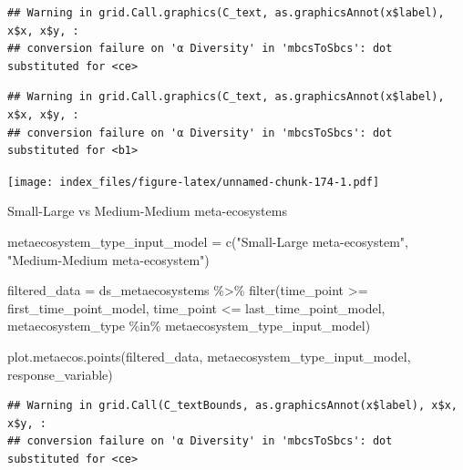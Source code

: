 \documentclass[
]{article}
\newenvironment{Shaded}{\begin{snugshade}}{\end{snugshade}}
\newcommand{\FunctionTok}[1]{\textcolor[rgb]{0.00,0.00,0.00}{#1}}
\newcommand{\NormalTok}[1]{#1}
\newcommand{\OtherTok}[1]{\textcolor[rgb]{0.56,0.35,0.01}{#1}}
\newcommand{\SpecialCharTok}[1]{\textcolor[rgb]{0.00,0.00,0.00}{#1}}
\newcommand{\StringTok}[1]{\textcolor[rgb]{0.31,0.60,0.02}{#1}}
\begin{document}
\begin{verbatim}
## Warning in grid.Call.graphics(C_text, as.graphicsAnnot(x$label), x$x, x$y, :
## conversion failure on 'α Diversity' in 'mbcsToSbcs': dot substituted for <ce>
\end{verbatim}

\begin{verbatim}
## Warning in grid.Call.graphics(C_text, as.graphicsAnnot(x$label), x$x, x$y, :
## conversion failure on 'α Diversity' in 'mbcsToSbcs': dot substituted for <b1>
\end{verbatim}

\texttt{[image: index\_files/figure-latex/unnamed-chunk-174-1.pdf]}

Small-Large vs Medium-Medium meta-ecosystems

\begin{Shaded}
\begin{Highlighting}[]
\NormalTok{metaecosystem\_type\_input\_model }\OtherTok{=} \FunctionTok{c}\NormalTok{(}\StringTok{"Small{-}Large meta{-}ecosystem"}\NormalTok{,}
                                   \StringTok{"Medium{-}Medium meta{-}ecosystem"}\NormalTok{)}
\end{Highlighting}
\end{Shaded}

\begin{Shaded}
\begin{Highlighting}[]
\NormalTok{filtered\_data }\OtherTok{=}\NormalTok{ ds\_metaecosystems }\SpecialCharTok{\%\textgreater{}\%}
                         \FunctionTok{filter}\NormalTok{(time\_point }\SpecialCharTok{\textgreater{}=}\NormalTok{ first\_time\_point\_model,}
\NormalTok{                                time\_point }\SpecialCharTok{\textless{}=}\NormalTok{ last\_time\_point\_model,}
\NormalTok{                                metaecosystem\_type }\SpecialCharTok{\%in\%}\NormalTok{ metaecosystem\_type\_input\_model)}
\end{Highlighting}
\end{Shaded}

\begin{Shaded}
\begin{Highlighting}[]
\FunctionTok{plot.metaecos.points}\NormalTok{(filtered\_data,}
\NormalTok{                     metaecosystem\_type\_input\_model,}
\NormalTok{                     response\_variable)}
\end{Highlighting}
\end{Shaded}

\begin{verbatim}
## Warning in grid.Call(C_textBounds, as.graphicsAnnot(x$label), x$x, x$y, :
## conversion failure on 'α Diversity' in 'mbcsToSbcs': dot substituted for <ce>
\end{verbatim}
\end{document}
